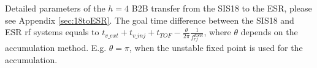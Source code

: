 Detailed parameters of the $h=4$ B2B transfer from the SIS18 to the ESR, please see Appendix \ref{sec:18toESR}.   
The goal time difference between the SIS18 and ESR rf systems equals to $t_{v\_ext}+t_{v\_inj}+t_{TOF}-\frac{\theta}{2\pi}\frac{1}{f_\mathit{rf}^\mathit{ESR}}$, where $\theta$ depends on the accumulation method. E.g. $\theta=\pi$, when the unstable fixed point is used for the accumulation.

